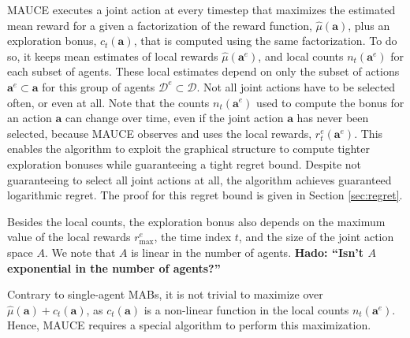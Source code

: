 \documentclass{article}
\newcommand{\est}{\hat{\mu}}
\def\hado#1{\textcolor{RubineRed}{\textbf{Hado: ``#1''}}}
\begin{document}
MAUCE executes a joint action at every timestep that maximizes the estimated mean reward for a given a factorization of the reward function, $\est(\mathbf{a})$, plus an exploration bonus, $c_t(\mathbf{a})$,  that is computed using the same factorization. To do so, it keeps mean estimates of local rewards $\hat{\mu}(\mathbf{a}^e)$, and local counts $n_t(\mathbf{a}^e)$ for each subset of agents. These local estimates depend on only the subset of actions $\mathbf{a}^e \subset \mathbf{a}$ for this group of agents $\mathcal{D}^e \subset \mathcal{D}$.
Not all joint actions have to be selected often, or even at all.  Note that the counts $n_t(\mathbf{a}^e)$ used to compute the bonus for an action $\mathbf{a}$ can change over time, even if the joint action $\mathbf{a}$ has never been selected, because MAUCE observes and uses the local rewards, $r^e_t(\mathbf{a}^e)$.  This enables the algorithm to exploit the graphical structure to compute tighter exploration bonuses while guaranteeing a tight regret bound. Despite not guaranteeing to select all joint actions at all, the algorithm achieves guaranteed logarithmic regret. The proof for this regret bound is given in Section \ref{sec:regret}. 

Besides the local counts, the exploration bonus also depends on the maximum value of the local rewards $r_{\max}^e$, the time index $t$, and the size of the joint action space $A$. We note that $A$ is linear in the number of agents. \hado{Isn't $A$ exponential in the number of agents?} 

Contrary to single-agent MABs, it is not trivial to maximize over $\est(\mathbf{a}) + c_t(\mathbf{a})$, as $c_t(\mathbf{a})$ is a non-linear function in the local counts $n_t(\mathbf{a}^e)$. Hence, MAUCE requires a special algorithm to perform this maximization. 
\end{document}
